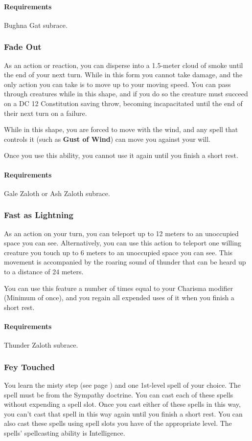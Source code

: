     \paragraph{Requirements} Bughna Gat subrace.
\subsubsection{Fade Out} \label{feat::fadeout}
    As an action or reaction, you can disperse into a 1.5-meter cloud of smoke until the end of your next turn.
    While in this form you cannot take damage, and the only action you can take is to move up to your moving speed.
    You can pass through creatures while in this shape, and if you do so the creature must succeed on a DC 12 Constitution saving throw, becoming incapacitated until the end of their next turn on a failure.

    While in this shape, you are forced to move with the wind, and any spell that controls it (such as \textbf{Gust of Wind}) can move you against your will.

    Once you use this ability, you cannot use it again until you finish a short rest.
    \paragraph{Requirements} Gale Zaloth or Ash Zaloth subrace.
\subsubsection{Fast as Lightning} \label{feat::fastaslightning}
    As an action on your turn, you can teleport up to 12 meters to an unoccupied space you can see.
    Alternatively, you can use this action to teleport one willing creature you touch up to 6 meters to an unoccupied space you can see.
    This movement is accompanied by the roaring sound of thunder that can be heard up to a distance of 24 meters.

    You can use this feature a number of times equal to your Charisma modifier (Minimum of once), and you regain all expended uses of it when you finish a short rest.
    \paragraph{Requirements} Thunder Zaloth subrace.
\subsubsection{Fey Touched} \label{feat::feytouched}
    You learn the misty step (see page \pageref{spell::mistystep}) and one 1st-level spell of your choice.
    The spell must be from the Sympathy doctrine.
    You can cast each of these spells without expending a spell slot.
    Once you cast either of these spells in this way, you can't cast that spell in this way again until you finish a short rest.
    You can also cast these spells using spell slots you have of the appropriate level.
    The spells' spellcasting ability is Intelligence.
